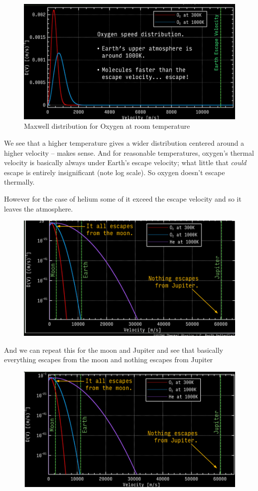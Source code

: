 \documentclass[10pt]{article}
\begin{document}
\begin{figure}[H]
	\centering
	\includegraphics[width=0.8\linewidth]{img/294_l11_maxwell_o2.png}
	\caption{Maxwell distribution for Oxygen at room temperature}
	\label{fig:294:oxygen_speed_maxwell}
\end{figure}

We see that a higher temperature gives a wider distribution centered around a higher velocity -- makes sense. 
And for reasonable temperatures, oxygen's thermal velocity is basically always under Earth's escape velocity; what little that \textit{could} escape is entirely insignificant (note log scale).
So oxygen doesn't escape thermally.

However for the case of helium some of it exceed the escape velocity and so it leaves the atmosphere.

\begin{figure}[H]
	\centering
	\includegraphics[width=0.8\linewidth]{img/294_l11_helium_maxwell.png}
\end{figure}

And we can repeat this for the moon and Jupiter and see that basically everything escapes from the moon and nothing escapes from Jupiter

\begin{figure}[H]
	\centering
	\includegraphics[width=0.8\linewidth]{img/294_l11_moon_jupiter_maxwellspeed.png}
\end{figure}
\end{document}
